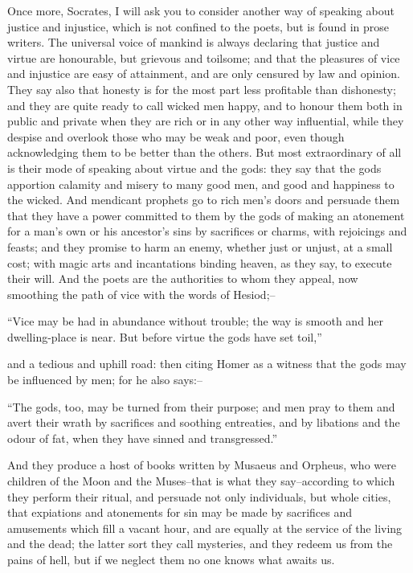 Once more, Socrates, I will ask you to consider another way of speaking
about justice and injustice, which is not confined to the poets, but
is found in prose writers. The universal voice of mankind is always
declaring that justice and virtue are honourable, but grievous and
toilsome; and that the pleasures of vice and injustice are easy of
attainment, and are only censured by law and opinion. They say also that
honesty is for the most part less profitable than dishonesty; and they
are quite ready to call wicked men happy, and to honour them both in
public and private when they are rich or in any other way influential,
while they despise and overlook those who may be weak and poor, even
though acknowledging them to be better than the others. But most
extraordinary of all is their mode of speaking about virtue and the
gods: they say that the gods apportion calamity and misery to many good
men, and good and happiness to the wicked. And mendicant prophets go to
rich men's doors and persuade them that they have a power committed
to them by the gods of making an atonement for a man's own or his
ancestor's sins by sacrifices or charms, with rejoicings and feasts; and
they promise to harm an enemy, whether just or unjust, at a small cost;
with magic arts and incantations binding heaven, as they say, to execute
their will. And the poets are the authorities to whom they appeal, now
smoothing the path of vice with the words of Hesiod;--

``Vice may be had in abundance without trouble; the way is smooth and her
dwelling-place is near. But before virtue the gods have set toil,''

and a tedious and uphill road: then citing Homer as a witness that the
gods may be influenced by men; for he also says:--

``The gods, too, may be turned from their purpose; and men pray to them
and avert their wrath by sacrifices and soothing entreaties, and by
libations and the odour of fat, when they have sinned and transgressed.''

And they produce a host of books written by Musaeus and Orpheus,
who were children of the Moon and the Muses--that is what they
say--according to which they perform their ritual, and persuade not only
individuals, but whole cities, that expiations and atonements for sin
may be made by sacrifices and amusements which fill a vacant hour, and
are equally at the service of the living and the dead; the latter sort
they call mysteries, and they redeem us from the pains of hell, but if
we neglect them no one knows what awaits us.

